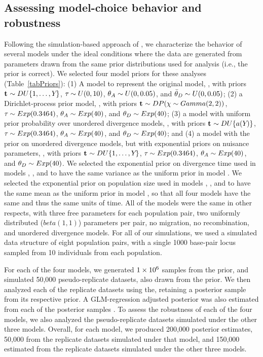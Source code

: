 \documentclass[letterpaper,12pt]{article}
\begin{document}
\begin{linenumbers}
\subsection*{Assessing model-choice behavior and robustness}
Following the simulation-based approach of \citet{Oaks2012}, we characterize
the behavior of several models under the ideal conditions where the
data are generated from parameters drawn from the same prior distributions used
for analysis (i.e., the prior is correct).
We selected four model priors for these analyses (Table~\ref{tabPriors}):
(1) A model to represent the original \msb model, \modelOld, with
priors
$\mathbf{t_{}} \sim DU\{1, \ldots, Y_{}\}$,
$\tau_{} \sim U(0,10)$,
$\ancestralTheta{} \sim U(0, 0.05)$,
and
$\descendantThetaMean{} \sim U(0, 0.05)$;
(2) a Dirichlet-process prior model, \modelDPP, with priors
$\mathbf{t_{}} \sim DP(\chi \sim Gamma(2,2))$,
$\tau_{} \sim Exp(0.3464)$,
$\ancestralTheta{} \sim Exp(40)$,
and
$\descendantTheta{}{} \sim Exp(40)$;
(3) a model with uniform prior probability over unordered divergence models,
\modelUniform, with priors
$\mathbf{t_{}} \sim DU\{a({Y_{}})\}$,
$\tau_{} \sim Exp(0.3464)$,
$\ancestralTheta{} \sim Exp(40)$,
and
$\descendantTheta{}{} \sim Exp(40)$;
and
(4) a model with the \msb prior on unordered divergence models, but with
exponential priors on nuisance parameters,
\modelUshaped, with priors
$\mathbf{t_{}} \sim DU\{1, \ldots, Y_{}\}$,
$\tau_{} \sim Exp(0.3464)$,
$\ancestralTheta{} \sim Exp(40)$,
and
$\descendantTheta{}{} \sim Exp(40)$.
We selected the exponential prior on divergence time used in models \modelDPP,
\modelUniform, and \modelUshaped to have the same variance as the
uniform prior in model \modelOld.
We selected the exponential prior on population size used in models \modelDPP,
\modelUniform, and \modelUniform to have the same mean as the uniform prior in
model \modelOld, so that all four models have the same  and thus the
same units of time.
All of the models were the same in other respects, with three free \myTheta{}
parameters for each population pair, two uniformly distributed ($beta(1,1)$)
\bottleScalar{}{} parameters per pair, no migration, no recombination,
and unordered divergence models.
For all of our simulations, we used a simulated data structure of eight
population pairs, with a single 1000 base-pair locus sampled from 10
individuals from each population.

For each of the four models, we generated $1\times 10^{6}$ samples from the prior, and
simulated 50,000 pseudo-replicate datasets, also drawn from the prior.
We then analyzed each of the replicate datasets using the, retaining a
posterior sample from its respective prior.
A GLM-regression adjusted posterior was also estimated from each of the
posterior samples \citep{Leuenberger2010}.
To assess the robustness of each of the four models, we also analyzed the
pseudo-replicate datasets simulated under the other three models.
Overall, for each model, we produced 200,000 posterior estimates,
50,000 from the replicate datasets simulated under that model,
and 150,000 estimated from the replicate datasets simulated under the
other three models.


\end{linenumbers}
\end{document}
